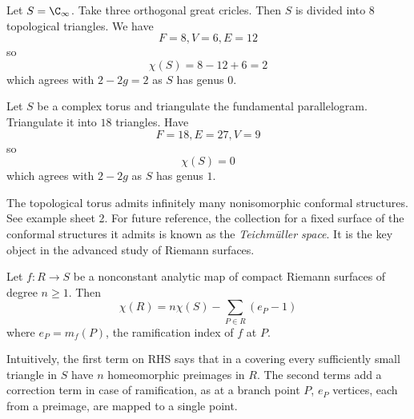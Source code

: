 \documentclass[a4paper]{article}
\begin{document}
\begin{eg}
  Let \(S = \C_\infty\). Take three orthogonal great cricles. Then \(S\) is divided into \(8\) topological triangles. We have
  \[
    F= 8, V = 6, E = 12
  \]
  so
  \[
    \chi(S) = 8 - 12 + 6 = 2
  \]
  which agrees with \(2 - 2g = 2\) as \(S\) has genus \(0\).
\end{eg}

\begin{eg}
  Let \(S\) be a complex torus and triangulate the fundamental parallelogram. Triangulate it into \(18\) triangles. Have
  \[
    F = 18, E = 27, V = 9
  \]
  so
  \[
    \chi(S) = 0
  \]
  which agrees with \(2 - 2g\) as \(S\) has genus \(1\).
\end{eg}

\begin{remark}
  The topological torus admits infinitely many nonisomorphic conformal structures. See example sheet 2. For future reference, the collection for a fixed surface of the conformal structures it admits is known as the \emph{Teichmüller space}. It is the key object in the advanced study of Riemann surfaces.
\end{remark}

\begin{theorem}
  Let \(f: R \to S\) be a nonconstant analytic map of compact Riemann surfaces of degree \(n \geq 1\). Then
  \[
    \chi(R) = n \chi(S) - \sum_{P \in R} (e_P - 1)
  \]
  where \(e_P = m_f(P)\), the ramification index of \(f\) at \(P\).
\end{theorem}

Intuitively, the first term on RHS says that in a covering every sufficiently small triangle in \(S\) have \(n\) homeomorphic preimages in \(R\). The second terms add a correction term in case of ramification, as at a branch point \(P\), \(e_P\) vertices, each from a preimage, are mapped to a single point.
\end{document}
